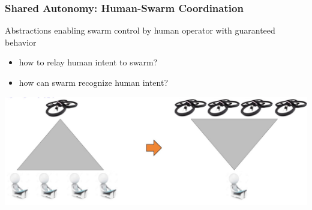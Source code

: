 \documentclass[10pt]{beamer}
\begin{document}
\begin{frame}

  \frametitle{Shared Autonomy: Human-Swarm Coordination}

    \alert{Abstractions} enabling swarm control by human operator with
    guaranteed behavior
    \begin{itemize}
    \item how to relay human intent to swarm?
    \item how can swarm recognize human intent?
    \end{itemize}
    
    \begin{center}
      \includegraphics[width=.7\linewidth]{human-swarm}      
    \end{center}


\end{frame}
\end{document}
